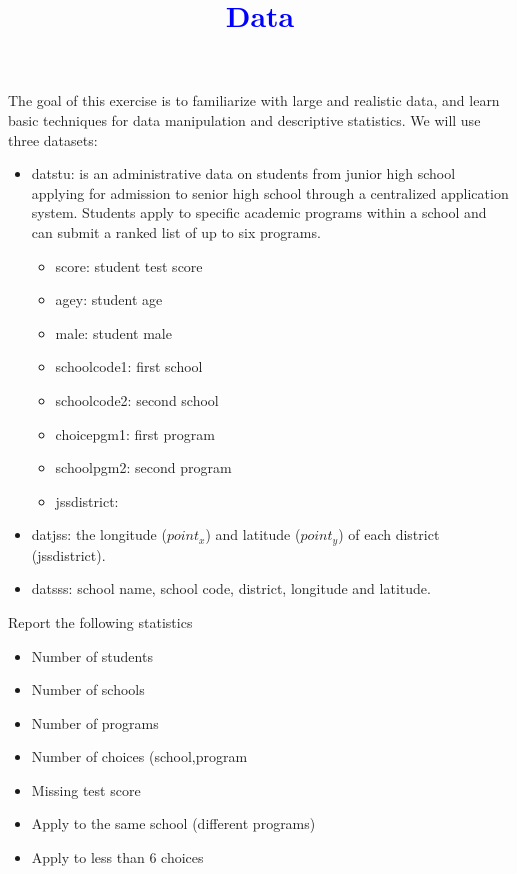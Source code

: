 \documentclass[10pt,a4paper]{article}
\newcommand{\1}{\mathds{1}}
\begin{document}
\doublespacing

\title{\textcolor{blue}{Data}}
\maketitle

The goal of this exercise is to familiarize with large and realistic data, and learn basic techniques for data manipulation and descriptive statistics. We will use three datasets:
\begin{itemize}
\item datstu: is an administrative data on students from junior high school applying for admission to senior high school through a centralized application system. Students apply to specific academic programs within a school and can submit a ranked list of up to six programs. 
\begin{itemize}
\item score: student test score
\item agey: student age
\item male: student male
\item schoolcode1: first school 
\item schoolcode2: second school
\item choicepgm1: first program 
\item schoolpgm2: second program
\item jssdistrict: 
\end{itemize}
\item datjss: the longitude ($point_x$) and latitude ($point_y$) of each district (jssdistrict).
\item datsss: school name, school code, district, longitude and latitude.
\end{itemize}

\begin{Exercise}[title=Missing data]
Report the following statistics
\begin{itemize}
\item Number of students
\item Number of schools
\item Number of programs
\item Number of choices (school,program
\item Missing test score
\item Apply to the same school (different programs)
\item Apply to less than 6 choices
\end{itemize}
\end{Exercise}
\end{document}
